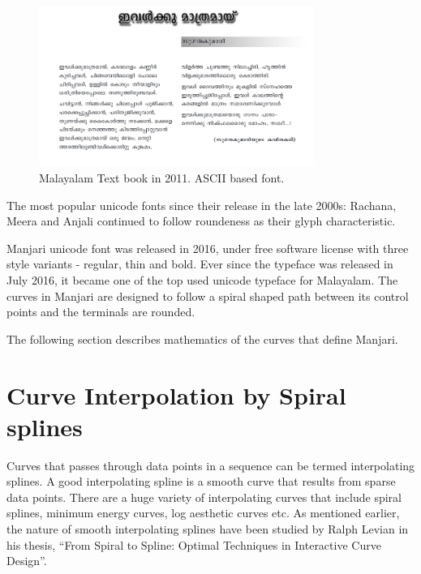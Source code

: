\documentclass[10pt]{article}
\begin{document}
\begin{figure}
	\centering
	\includegraphics[width=0.8\textwidth]{images/2011-Malayalam-Textbook.png}
	\caption{Malayalam Text book in 2011. ASCII based font.}
	\label{maltextbook}
\end{figure}

 
 The most popular unicode fonts since their release in the late 2000s:  Rachana, Meera and Anjali continued to follow roundeness as their glyph characteristic. 

 
 Manjari unicode font was released in 2016,  under free software license with three style variants - regular, thin and bold. Ever since the typeface was released in July 2016, it became one of the top used unicode typeface for Malayalam. The curves in Manjari are designed to follow a spiral shaped path between its control points and the terminals are rounded. %
 
 The following section describes mathematics of the curves that define Manjari. 
 


\section{Curve Interpolation by Spiral splines}

Curves that passes through data points in a sequence can be termed interpolating splines. A good interpolating spline is a smooth curve that results from sparse data points. There are a huge variety  of interpolating curves that include spiral splines, minimum energy curves, log aesthetic curves etc. As mentioned earlier, the nature of smooth interpolating splines have been studied by Ralph Levian in his thesis, “From Spiral to Spline: Optimal Techniques in Interactive Curve Design”\cite{levian}.
\end{document}
